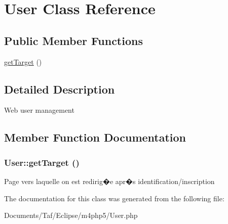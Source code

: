 \hypertarget{classUser}{
\section{User Class Reference}
\label{classUser}
}
\subsection*{Public Member Functions}
\begin{CompactItemize}
\item 
\hyperlink{classUser_47caa4b60228d14dd494c46d2cafedbb}{getTarget} ()
\end{CompactItemize}


\subsection{Detailed Description}
Web user management 

\subsection{Member Function Documentation}
\hypertarget{classUser_47caa4b60228d14dd494c46d2cafedbb}{
\subsubsection[getTarget]{\setlength{\rightskip}{0pt plus 5cm}User::getTarget ()}}
\label{classUser_47caa4b60228d14dd494c46d2cafedbb}


Page vers laquelle on est redirig�e apr�s identification/inscription 

The documentation for this class was generated from the following file:\begin{CompactItemize}
\item 
Documents/Taf/Eclipse/m4php5/User.php\end{CompactItemize}
